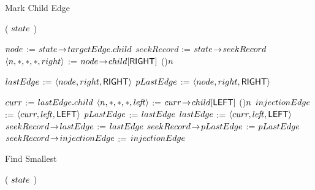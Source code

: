 \begin{limitscope}
\begin{algorithm}[htp]
{{			
	 }

   \Return \True\;
}
\caption{Mark Child Edge}
\label{algo:icdcn-markChildEdge}



\end{algorithm}


\begin{algorithm}[htp]
\DefineKeyWords

\BlankLine

\DontPrintSemicolon
\Boolean \FindSmallest( $state$ )\;
\PrintSemicolon
\Begin
{
	 $node$ := $state \!\rightarrow\! targetEdge.child$\;
	 $seekRecord$ := $state \!\rightarrow\! seekRecord$\;
	 $\langle  n, \ast, \ast, \ast, right  \rangle$ := $node \!\rightarrow\! child[\textsf{RIGHT}]$\;
	 \If(){$n$}
	 {
			\Return \False\;
	 }
	
	 \BlankLine	
		
	 
	
	 $lastEdge$ := $\langle  node, right, \textsf{RIGHT}  \rangle$\;
	 $pLastEdge$ := $\langle  node, right, \textsf{RIGHT}  \rangle$\;
		 
	 	
	 \While{\True}
	 {
	    $curr$ := $lastEdge.child$\;
      $\langle  n, \ast, \ast, \ast, le\!f\!t  \rangle$ := $curr \!\rightarrow\! child[\textsf{LEFT}]$\;			
			\If(){$n$}	
			{
			   $injectionEdge$ := $\langle curr, le\!f\!t, \textsf{LEFT} \rangle$\;
			   \Break\;
			}				
			\BlankLine			
			$pLastEdge$ := $lastEdge$\;
	    $lastEdge$ := $\langle  curr, le\!f\!t, \textsf{LEFT}  \rangle$\;			
	 }	
	 \BlankLine
	 $seekRecord \!\rightarrow\! lastEdge$ := $lastEdge$\;
	 $seekRecord \!\rightarrow\! pLastEdge$ := $pLastEdge$\;
   $seekRecord \!\rightarrow\! injectionEdge$ := $injectionEdge$\;
	 \Return \True\;	
}
\caption{Find Smallest}
\label{algo:icdcn-findSmallest}
\end{algorithm}


\begin{algorithm}[htp]
\DefineKeyWords


\DontPrintSemicolon
\InitializeTypeAndUpdateMode( $state$ )\;
\PrintSemicolon
\Begin
{

}
\end{algorithm}
\end{limitscope}
